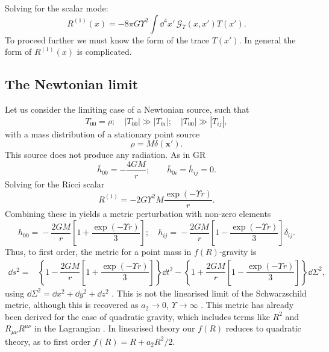 Solving for the scalar mode:
\begin{equation}
R^{(1)}(x) = -8 \pi G \Upsilon^2 \int \dd^4 x'\, \mathscr{G}_\Upsilon(x, x') T(x').
\end{equation}
To proceed further we must know the form of the trace $T(x')$. In general the form of $R^{(1)}(x)$ is complicated.

\subsection{The Newtonian limit}

Let us consider the limiting case of a Newtonian source, such that
\begin{equation}
T_{00} = \rho; \quad |T_{00}| \gg |T_{0i}|; \quad |T_{00}| \gg |T_{ij}|,
\end{equation}
with a mass distribution of a stationary point source
\begin{equation}
\rho = M\delta(\boldsymbol{x'}).
\end{equation}
This source does not produce any radiation. As in GR
\begin{equation}
\overline{h}_{00} = -\dfrac{4GM}{r}; \qquad \overline{h}_{0i} = \overline{h}_{ij} = 0.
\end{equation}
Solving for the Ricci scalar \citep{Havas1977}
\begin{equation}
R^{(1)} = -2 G \Upsilon^2 M \dfrac{\exp(- \Upsilon r)}{r}.
\end{equation}
Combining these in  yields a metric perturbation with non-zero elements 
\begin{equation}
h_{00} = {} -\dfrac{2GM}{r}\left[1 + \dfrac{\exp(- \Upsilon r)}{3}\right]; \quad
h_{ij} = {} -\dfrac{2GM}{r}\left[1 - \dfrac{\exp(- \Upsilon r)}{3}\right]\delta_{ij}.
\end{equation}
Thus, to first order, the metric for a point mass in $f(R)$-gravity is
\begin{align}
\dd s^2 = {} & \left\{1-\dfrac{2GM}{r}\left[1 + \dfrac{\exp(- \Upsilon r)}{3}\right]\right\}\dd t^2 - \left\{1+\dfrac{2GM}{r}\left[1 - \dfrac{\exp(- \Upsilon r)}{3}\right]\right\}\dd \Sigma^2,
\label{eq:f(R)_Schw}
\end{align}
using $\dd \Sigma^2 = \dd x^2 + \dd y^2 + \dd z^2$ \citep{Capozziello2007, Capozziello2009a, Naf2010}. This is not the linearised limit of the Schwarzschild metric, although this is recovered as $a_2 \rightarrow 0$, $\Upsilon \rightarrow \infty$ \citep{Chiba2007a}. This metric has already been derived for the case of quadratic gravity, which includes terms like $R^2$ and $R_{\mu\nu}R^{\mu\nu}$ in the Lagrangian \citep{Pechlaner1966, Stelle1978, Schmidt1986, Teyssandier1990}. In linearised theory our $f(R)$ reduces to quadratic theory, as to first order $f(R) = R + a_2 R^2/2$.

